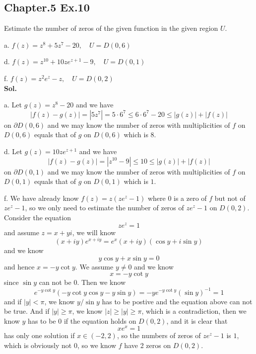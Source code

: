 \documentclass[lang=en,11pt,a4paper,citestyle =authoryear]{elegantpaper}
\begin{document}
\subsection*{Chapter.5 Ex.10} 
Estimate the number of zeros of the given function in the given region $U$.\par
a. $f(z) = z^8+5z^7-20,\quad U = D(0,6)$\par
d. $f(z) = z^{10}+10ze^{z+1}-9,\quad U = D(0,1)$\par
f. $f(z) = z^2e^z-z,\quad U = D(0,2)$
\vspace{0.5em}\\
\textbf{Sol.} \par
a. Let $g(z) = z^8-20$ and we have
\[
|f(z)-g(z)| = |5z^7| = 5\cdot 6^7 \leq 6\cdot 6^7 - 20 \leq |g(z)|+|f(z)|
\]
on $\partial D(0,6)$ and we may know the number of zeros with multiplicities of $f$ on $D(0,6)$ equals that of $g$ on $D(0,6)$ which is 8.\par
d. Let $g(z) = 10ze^{z+1}$ and we have
\[
|f(z)-g(z)| = |z^{10}-9| \leq  10 \leq |g(z)|+|f(z)|
\]
on $\partial D(0,1)$ and we may know the number of zeros with multiplicities of $f$ on $D(0,1)$ equals that of $g$ on $D(0,1)$ which is $1$.\par
f. We have already know $f(z) = z(ze^z -1)$ where $0$ is a zero of $f$ but not of $ze^z - 1$, so we only need to estimate the number of zeros of $ze^z - 1$ on $D(0,2)$. Consider the equation
\[ze^z = 1\]
and assume $z = x+yi$, we will know
\[
(x+iy)e^{x+iy} = e^x(x+iy)(\cos y+i\sin y)
\]
and we know
\[
y\cos y + x\sin y = 0
\]
and hence $x = - y \cot y$. We assume $y\neq 0$ and we know
\[
x = - y\cot y
\]
since $\sin y$ can not be $0$. Then we know
\[
e^{-y\cot y}(-y\cot y\cos y - y \sin y) = -ye^{-y\cot y}(\sin y)^{-1} = 1
\]
and if $|y| < \pi$, we know $y/\sin y$ has to be postive and the equation above can not be true. And if $|y|\geq \pi$, we know $|z| \geq |y| \geq \pi$, which is a contradiction, then we know $y$ has to be $0$ if the equation holds on $D(0,2)$, and it is clear that
\[xe^x = 1\]
has only one solution if $x\in (-2,2)$, so the numbers of zeros of $ze^z- 1$ is $1$, which is obviously not $0$, so we know $f$ have 2 zeros on $D(0,2)$.
\vspace{0.5em}

\addappheadtotoc
\end{document}
